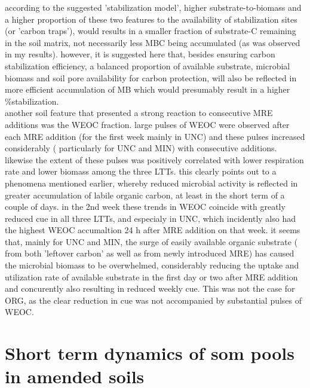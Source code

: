 \documentclass[12pt]{report}
\begin{document}
		according to the suggested 'stabilization model', higher substrate-to-biomass and a higher proportion of these two features to the availability of stabilization sites (or 'carbon traps'), would results in a smaller fraction of substrate-C remaining in the soil matrix, not necessarily less MBC being accumulated (as was observed in my results). however, it is suggested here that, besides ensuring carbon stabilization efficiency, a balanced proportion of available substrate, microbial biomass and soil pore availability for carbon protection, will also be reflected in more efficient accumulation of MB which would presumably result in a higher \%stabilization.\\
		another soil feature that presented a strong reaction to consecutive MRE additions was the WEOC fraction. large pulses of WEOC were observed after each MRE addition (for the first week mainly in UNC) and these pulses increased considerably ( particularly for UNC and MIN) with consecutive additions. likewise the extent of these pulses was positively correlated with lower respiration rate and lower biomass among the three LTTs. this clearly points out to a phenomena mentioned earlier, whereby reduced microbial activity is reflected in greater accumulation of labile organic carbon, at least in the short term of a couple of days. in the 2nd week these trends in WEOC coincide with greatly reduced \gls{cue} in all three LTTs, and especialy in UNC, which incidently also had the highest WEOC accumaltion 24 h after MRE addition on that week. it seems that, mainly for UNC and MIN, the surge of easily available organic substrate ( from both 'leftover carbon' as well as from newly introduced MRE) has caused the microbial biomass to be overwhelmed, considerably reducing the uptake and utilization rate of available substrate in the first day or two after MRE addition and concurently also resulting in reduced weekly \gls{cue}.
		This was not the case for ORG, as the clear reduction in \gls{cue} was not accompanied by substantial pulses of WEOC.
		
		\section{Short term dynamics of \gls{som} pools in amended soils}
		
\end{document}
